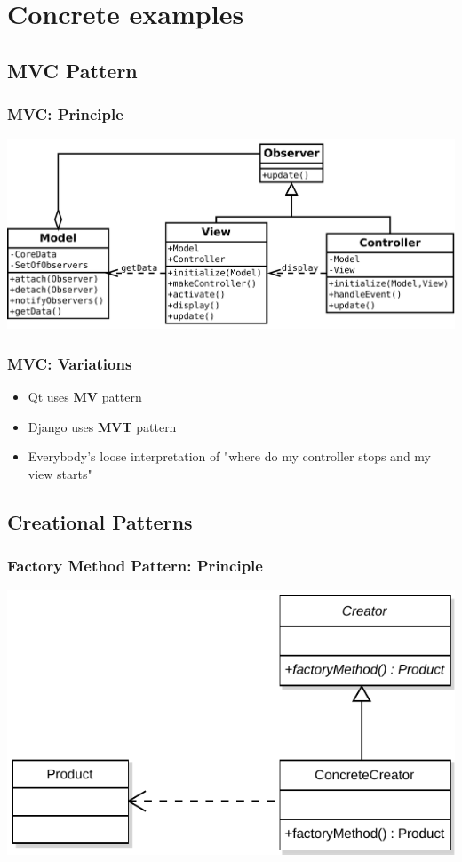 \documentclass{beamer}
\begin{document}
\section{Concrete examples}

\subsection{MVC Pattern}
\begin{frame}
\frametitle{MVC: Principle}
\begin{center}
   \includegraphics[width=\textwidth]{MVC.pdf}
\end{center}
\end{frame} 

\begin{frame}
\frametitle{MVC: Variations}
\begin{itemize}
 \item Qt uses \textbf{MV} pattern
 \item Django uses \textbf{MVT} pattern
 \item <only 2->Everybody's loose interpretation of "where do my controller stops and my view starts" 
\end{itemize}

\end{frame}

\subsection{Creational Patterns}
\begin{frame}
\frametitle{Factory Method Pattern: Principle}
\begin{center}
   \includegraphics[width=\textwidth]{FactoryMethod.pdf}
\end{center}
\end{frame} 
\end{document}
